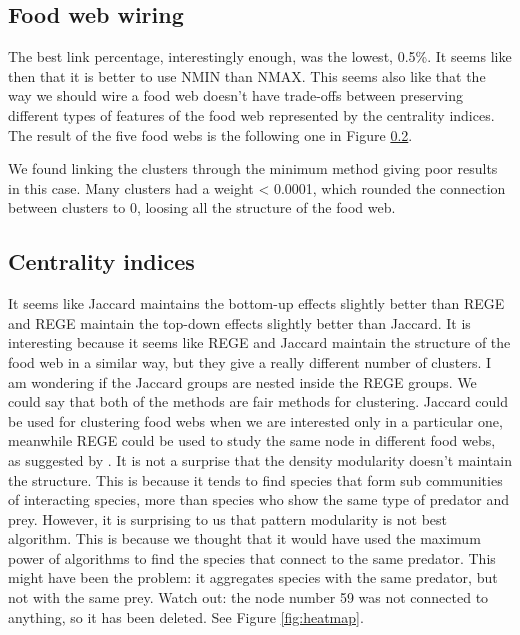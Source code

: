 \documentclass[twocolumn]{article}
\begin{document}
    \subsection{Food web wiring}
        The best link percentage, interestingly enough, was the lowest, 0.5\%. It seems like then that it is better to use NMIN than NMAX. This seems also like that the way we should wire a food web doesn't have trade-offs between preserving different types of features of the food web represented by the centrality indices. The result of the five food webs is the following one in Figure \ref{}. 
        \par We found linking the clusters through the minimum method giving poor results in this case. Many clusters had a weight < 0.0001, which rounded the connection between clusters to 0, loosing all the structure of the food web.  
    \subsection{Centrality indices}
        It seems like Jaccard maintains the bottom-up effects slightly better than REGE and REGE maintain the top-down effects slightly better than Jaccard. It is interesting because it seems like REGE and Jaccard maintain the structure of the food web in a similar way, but they give a really different number of clusters. I am wondering if the Jaccard groups are nested inside the REGE groups. We could say that both of the methods are fair methods for clustering. Jaccard could be used for clustering food webs when we are interested only in a particular one, meanwhile REGE could be used to study the same node in different food webs, as suggested by \citet{Luczkovich2003}. It is not a surprise that the density modularity doesn't maintain the structure. This is because it tends to find species that form sub communities of interacting species, more than species who show the same type of predator and prey. However, it is surprising to us that pattern modularity is not best algorithm. This is because we thought that it would have used the maximum power of algorithms to find the species that connect to the same predator. This might have been the problem: it aggregates species with the same predator, but not with the same prey.
        Watch out: the node number 59 was not connected to anything, so it has been deleted. See Figure \ref{fig:heatmap}.
\end{document}
